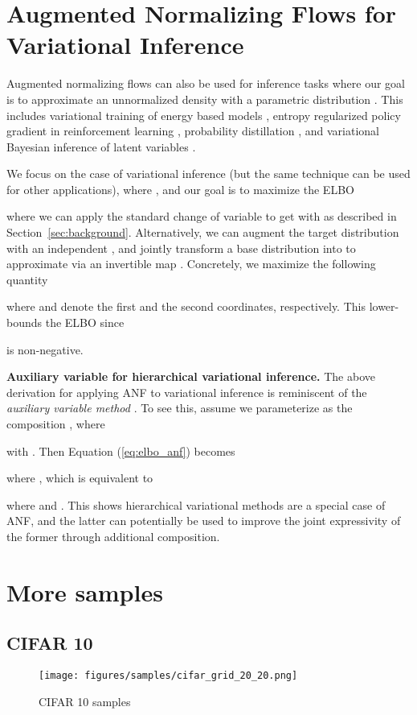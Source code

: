 \documentclass{article}
\begin{document}
\clearpage

\section{Augmented Normalizing Flows for Variational Inference}
\label{app:anf_vi}
Augmented normalizing flows can also be used for inference tasks where our goal is to approximate an unnormalized density  with a parametric distribution . 
This includes variational training of energy based models \citep{dai2017calibrating, zhai2016generative}, entropy regularized policy gradient in reinforcement learning \citep{mazoure2019leveraging, ward2019improving}, probability distillation \citep{oord2017parallel}, and variational Bayesian inference of latent variables \citep{kingma2013auto}. 

We focus on the case of variational inference (but the same technique can be used for other applications), where , and our goal is to maximize the ELBO

where we can apply the standard change of variable to get  with  as described in Section~\ref{sec:background}.
Alternatively, we can augment the target distribution  with an independent , and jointly transform a base distribution  into  to approximate  via an invertible map .
Concretely, we maximize the following quantity

where  and  denote the first and the second coordinates, respectively.
This lower-bounds the ELBO since 

is non-negative. 

{\bf Auxiliary variable for hierarchical variational inference.} The above derivation for applying ANF to variational inference is reminiscent of the \textit{auxiliary variable method} \citep{agakov2004auxiliary, ranganath2016hierarchical}.
To see this, assume we parameterize  as the composition , where 

with .
Then Equation (\ref{eq:elbo_anf})
becomes

where , which is equivalent to

where  and .
This shows hierarchical variational methods are a special case of ANF, and the latter can potentially be used to improve the joint expressivity of the former through additional composition. 


\newpage
\section{More samples}
\label{app:samples}
\subsection{CIFAR 10}
\begin{figure*}[h!]
    \centering
    \texttt{[image: figures/samples/cifar\_grid\_20\_20.png]}
    \caption{CIFAR 10 samples}
    \label{fig:cifar_grid}
\end{figure*}
\end{document}
